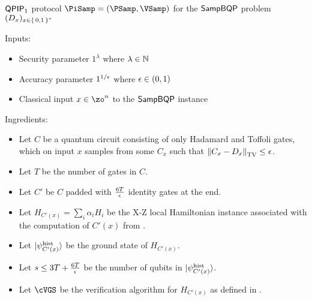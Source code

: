 \begin{protocol}{$\operatorname{\mathsf{QPIP}}_1$ protocol $\PiSamp=(\PSamp, \VSamp)$ for the $\operatorname{\mathsf{SampBQP}}$ problem $(D_x)_{x\in\set{0, 1}^*}$}
	\label{ProtoQPIP1}

	Inputs:
	\begin{itemize}
		\item Security parameter $1^\lambda$ where $\lambda\in\mathbb{N}$
		\item Accuracy parameter $1^{1/\epsilon}$ where $\epsilon\in(0, 1)$
		\item Classical input $x\in\zo^n$ to the $\operatorname{\mathsf{SampBQP}}$ instance
	\end{itemize}

	Ingredients:
	\begin{itemize}
		\item Let $C$ be a quantum circuit consisting of only Hadamard and Toffoli gates, which on input $x$ samples from some $C_x$ such that $\left\lVert C_x-D_x\right\rVert_{\mathrm{TV}}\leq\epsilon$.
		\item Let $T$ be the number of gates in $C$.
		\item Let $C'$ be $C$ padded with $\frac{6T}{\epsilon}$ identity gates at the end.
		\item Let $H_{C'(x)}=\sum_i \alpha_i H_i$ be the X-Z local Hamiltonian instance associated with the computation of $C'(x)$ from .
		\item Let $\ket{\psi_{{C'(x)}}^{\mathrm{hist}}}$ be the ground state of $H_{C'(x)}$.
		\item Let $s\leq 3T+\frac{6T}{\epsilon}$ be the number of qubits in $\ket{\psi_{C'(x)}^{\mathrm{hist}}}$.
		\item Let $\cVGS$ be the verification algorithm for $H_{C'(x)}$ as defined in .
	\end{itemize}


\end{protocol}
